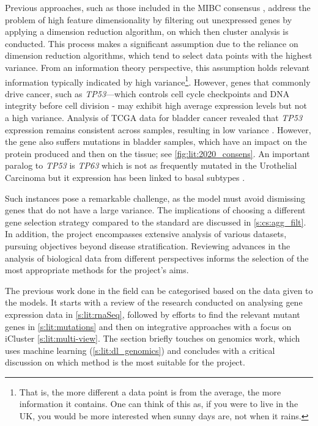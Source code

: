 Previous approaches, such as those included in the MIBC consensus \citep{Kamoun2020-tj}, address the problem of high feature dimensionality by filtering out unexpressed genes by applying a dimension reduction algorithm, on which then cluster analysis is conducted. This process makes a significant assumption due to the reliance on dimension reduction algorithms, which tend to select data points with the highest variance. From an information theory perspective, this assumption holds relevant information typically indicated by high variance\footnote{That is, the more different a data point is from the average, the more information it contains. One can think of this as, if you were to live in the UK, you would be more interested when  sunny days are, not when it rains.}. However, genes that commonly drive cancer, such as \textit{TP53}—which controls cell cycle checkpoints and DNA integrity before cell division - may exhibit high average expression levels but not a high variance. Analysis of TCGA data for bladder cancer revealed that \textit{TP53} expression remains consistent across samples, resulting in low variance \citep{Robertson2017-mg}. However, the gene also suffers mutations in bladder samples, which have an impact on the protein produced and then on the tissue; see \cref{fig:lit:2020_consens}. An important paralog to \textit{TP53} is \textit{TP63} which is not as frequently mutated in the Urothelial Carcinoma but it expression has been linked to basal subtypes \citep{Choi2012-kk,Karni-Schmidt2011-ps,Choi2014-ed}.

Such instances pose a remarkable challenge, as the model must avoid dismissing genes that do not have a large variance. The implications of choosing a different gene selection strategy compared to the standard are discussed in \cref{s:cs:agg_filt}. In addition, the project encompasses extensive analysis of various datasets, pursuing objectives beyond disease stratification. Reviewing advances in the analysis of biological data from different perspectives informs the selection of the most appropriate methods for the project's aims.


The previous work done in the field can be categorised based on the data given to the models. It starts with a review of the research conducted on analysing gene expression data in \ref{s:lit:rnaSeq}, followed by efforts to find the relevant mutant genes in \ref{s:lit:mutations} and then on integrative approaches with a focus on iCluster \ref{s:lit:multi-view}. The section briefly touches on genomics work, which uses machine learning (\ref{s:lit:dl_genomics}) and concludes with a critical discussion on which method is the most suitable for the project.

